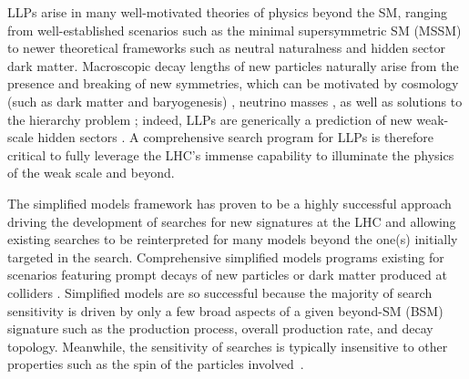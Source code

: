 

\noindent LLPs arise in many well-motivated theories of physics beyond the SM, ranging from  well-established scenarios such as the minimal supersymmetric  SM (MSSM) to newer theoretical frameworks such as neutral naturalness and hidden sector dark matter.  Macroscopic decay lengths of new particles naturally arise from the presence and breaking of new symmetries, which can be motivated by cosmology (such as dark matter and baryogenesis) \cite{Bouquet:1986mq, Campbell:1990fa, Cui:2012jh, Barry:2013nva, Cui:2014twa, Ipek:2016bpf,Feng:2008ya,Baumgart:2009tn, Kaplan:2009ag,
  Chan:2011aa, Dienes:2011ja, Dienes:2012yz, Kim:2013ivd}, neutrino masses \cite{Helo:2013esa, Antusch:2016vyf,Graesser:2007yj, Graesser:2007pc, Izaguirre:2015pga,Maiezza:2015lza, Batell:2016zod,Cottin:2018kmq,Nemevsek:2018bbt}, as well as solutions to the hierarchy problem  \cite{Giudice:1998bp,Burdman:2006tz, Cai:2008au, Chacko:2005pe,Fan:2011yu,Barbier:2004ez, Csaki:2013jza,Arvanitaki:2012ps, ArkaniHamed:2012gw}; indeed, LLPs are generically a prediction of new weak-scale hidden sectors \cite{Chen:1995yu,Thomas:1998wy,Feng:1999fu,Strassler:2006im,Strassler:2006ri,Strassler:2006qa,Han:2007ae,Strassler:2008bv,Strassler:2008fv}.  A comprehensive search program for LLPs is therefore critical to fully leverage the LHC's immense capability to illuminate the physics of the weak scale and beyond. 
  
 The simplified models framework has proven to be a highly successful approach driving the development of  searches for new signatures at the LHC and allowing existing searches to be reinterpreted for many models beyond the one(s) initially targeted in the search. Comprehensive simplified models programs existing for scenarios featuring prompt decays of new particles \cite{ArkaniHamed:2005px,Knuteson:2006ha,ArkaniHamed:2007fw,Aaltonen:2007dg,Alwall:2008ag,Alwall:2008va,Alves:2011wf} or dark matter produced at colliders \cite{Petriello:2008pu,Dudas:2009uq,Goodman:2011jq,An:2012va,Frandsen:2012rk,Dreiner:2013vla,Cotta:2013jna,Abdallah:2015ter}.  Simplified models are so successful because the majority of search sensitivity is driven by only a few broad aspects of a given beyond-SM (BSM) signature such as the production process, overall production rate, and decay topology. Meanwhile, the sensitivity of searches is typically insensitive to other properties such as the spin of the particles involved~\cite{Edelhauser:2015ksa,Edelhauser:2014ena,Arina:2015uea,Kraml:2016eti}.


